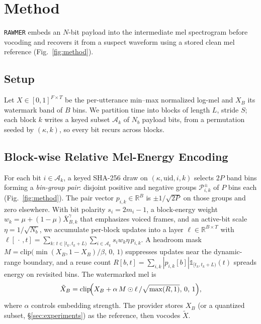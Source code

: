 \section{Method}
\label{sec:method}

\texttt{RAWMER} embeds an $N$-bit payload into the intermediate mel spectrogram before vocoding and recovers it from a suspect waveform using a stored clean mel reference (Fig.~\ref{fig:method}).

\subsection{Setup}
\label{sec:method:setup}
Let $X\!\in\![0,1]^{F\times T}$ be the per-utterance min--max normalized log-mel and $X_B$ its watermark band of $B$ bins. We partition time into blocks of length $L$, stride $S$; each block $k$ writes a keyed subset $\mathcal{A}_k$ of $N_b$ payload bits, from a permutation seeded by $(\kappa,k)$, so every bit recurs across blocks.

\subsection{Block-wise Relative Mel-Energy Encoding}
\label{sec:method:enc}
For each bit $i\!\in\!\mathcal{A}_k$, a keyed SHA-256 draw on $(\kappa,\mathrm{uid},i,k)$ selects $2P$ band bins forming a \emph{bin-group pair}: disjoint positive and negative groups $\mathcal{P}^{\pm}_{i,k}$ of $P$ bins each (Fig.~\ref{fig:method}). The pair vector $p_{i,k}\!\in\!\mathbb{R}^B$ is $\pm 1/\sqrt{2P}$ on those groups and zero elsewhere. With bit polarity $s_i\!=\!2m_i\!-\!1$, a block-energy weight $w_k\!=\!\mu\!+\!(1\!-\!\mu)\bar X_{B,k}^{\gamma}$ that emphasizes voiced frames, and an active-bit scale $\eta\!=\!1/\sqrt{N_b}$, we accumulate per-block updates into a layer $\ell\!\in\!\mathbb{R}^{B\times T}$ with $\ell[\,\cdot\,,t]\!=\!\sum_{k:\,t\in[t_k,t_k+L)}\sum_{i\in\mathcal{A}_k} s_i w_k \eta\, p_{i,k}$. A headroom mask $M\!=\!\mathrm{clip}\!\bigl(\min(X_B,1\!-\!X_B)/\beta,\,0,\,1\bigr)$ suppresses updates near the dynamic-range boundary, and a reuse count $R[b,t]\!=\!\sum_{i,k}|p_{i,k}[b]|\mathbb{1}_{[t_k,t_k+L)}(t)$ spreads energy on revisited bins. The watermarked mel is
\begin{equation}
\tilde X_B = \mathrm{clip}\!\Bigl(X_B + \alpha\,M \odot \ell\,/\sqrt{\max(R,1)},\,0,\,1\Bigr),
\label{eq:embed}
\end{equation}
where $\alpha$ controls embedding strength. The provider stores $X_B$ (or a quantized subset, \S\ref{sec:experiments}) as the reference, then vocodes $\tilde X$.

